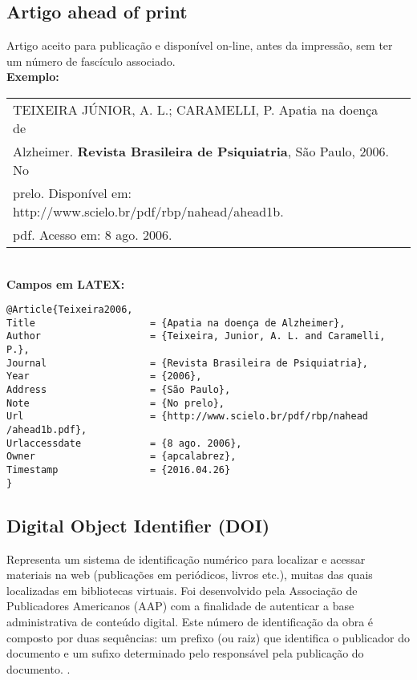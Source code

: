 \subsection{Artigo ahead of print}

Artigo aceito para publicação e disponível on-line, antes da impressão,
sem ter um número de fascículo associado. \\

\textbf{Exemplo:} \\


\begin{tabular}{|l|c|} \hline
	TEIXEIRA JÚNIOR, A. L.; CARAMELLI, P. Apatia na doença de \\Alzheimer. \textbf{Revista Brasileira de Psiquiatria}, São Paulo, 2006. No\\ prelo. Disponível em:
	http://www.scielo.br/pdf/rbp/nahead/ahead1b.\\pdf. Acesso em: 8 ago.
	2006. 
	\\\hline
\end{tabular} \\

\textbf{Campos em LATEX:} 

\begin{verbatim}
@Article{Teixeira2006,
Title                    = {Apatia na doença de Alzheimer},
Author                   = {Teixeira, Junior, A. L. and Caramelli, 
P.},
Journal                  = {Revista Brasileira de Psiquiatria},
Year                     = {2006},
Address                  = {São Paulo},
Note                     = {No prelo},
Url                      = {http://www.scielo.br/pdf/rbp/nahead
/ahead1b.pdf},
Urlaccessdate            = {8 ago. 2006},
Owner                    = {apcalabrez},
Timestamp                = {2016.04.26}
}
\end{verbatim}

\subsection{Digital Object Identifier (DOI)}

Representa um sistema de identificação num\'erico para localizar e
acessar materiais na web (publicações em periódicos, livros etc.), muitas
das quais localizadas em bibliotecas virtuais. Foi desenvolvido pela
Associação de Publicadores Americanos (AAP) com a finalidade de autenticar a base administrativa de conteúdo digital. Este número de
identificação da obra \'e composto por duas sequ\^encias: um prefixo (ou
raiz) que identifica o publicador do documento e um sufixo determinado
pelo respons\'avel pela publicação do documento. \cite{Doic2016}.

